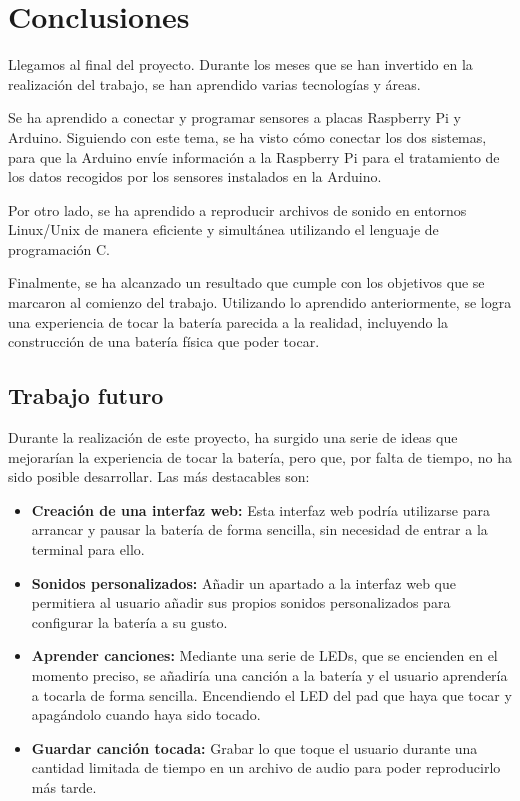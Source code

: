 
\chapter{Conclusiones}
\label{cha:Conclusiones}

    Llegamos al final del proyecto. Durante los meses que se han invertido en la realización del trabajo, se han
    aprendido varias tecnologías y áreas.

    Se ha aprendido a conectar y programar sensores a placas Raspberry Pi y Arduino. Siguiendo con este tema, se ha
    visto cómo conectar los dos sistemas, para que la Arduino envíe información a la Raspberry Pi para el tratamiento de
    los datos recogidos por los sensores instalados en la Arduino.

    Por otro lado, se ha aprendido a reproducir archivos de sonido en entornos Linux/Unix de manera eficiente y
    simultánea utilizando el lenguaje de programación C.

    Finalmente, se ha alcanzado un resultado que cumple con los objetivos que se marcaron al comienzo del trabajo.
    Utilizando lo aprendido anteriormente, se logra una experiencia de tocar la batería parecida a la realidad,
    incluyendo la construcción de una batería física que poder tocar.

    \section{Trabajo futuro} %
    \label{sec:TrabajoFuturo}

        Durante la realización de este proyecto, ha surgido una serie de ideas que mejorarían la experiencia de tocar la
        batería, pero que, por falta de tiempo, no ha sido posible desarrollar. Las más destacables son:

        \begin{itemize}
            \item \textbf{Creación de una interfaz web:} Esta interfaz web podría utilizarse para arrancar y pausar la
            batería de forma sencilla, sin necesidad de entrar a la terminal para ello.
            \item \textbf{Sonidos personalizados:} Añadir un apartado a la interfaz web que permitiera al usuario
            añadir sus propios sonidos personalizados para configurar la batería a su gusto.
            \item \textbf{Aprender canciones:} Mediante una serie de LEDs, que se encienden en el momento preciso, se
            añadiría una canción a la batería y el usuario aprendería a tocarla de forma sencilla. Encendiendo el LED
            del pad que haya que tocar y apagándolo cuando haya sido tocado.
            \item \textbf{Guardar canción tocada:} Grabar lo que toque el usuario durante una cantidad limitada de
            tiempo en un archivo de audio para poder reproducirlo más tarde.
        \end{itemize}



\newpage
